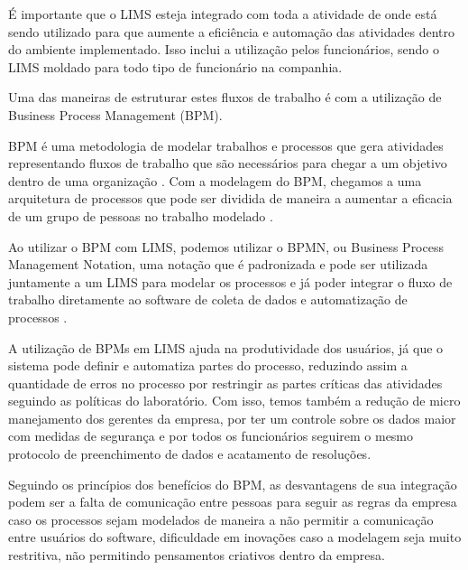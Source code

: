 
É importante que o LIMS esteja integrado com toda a atividade de onde está sendo utilizado para que aumente a eficiência e automação das atividades dentro do ambiente implementado. Isso inclui a utilização pelos funcionários, sendo o LIMS moldado para todo tipo de funcionário na companhia.

Uma das maneiras de estruturar estes fluxos de trabalho é com a utilização de Business Process Management (BPM).

BPM é uma metodologia de modelar trabalhos e processos que gera atividades representando fluxos de trabalho que são necessários para chegar a um objetivo dentro de uma organização \R. Com a modelagem do BPM, chegamos a uma arquitetura de processos que pode ser dividida de maneira a aumentar a eficacia de um grupo de pessoas no trabalho modelado \R.


Ao utilizar o BPM com LIMS, podemos utilizar o BPMN, ou Business Process Management Notation, uma notação que é padronizada \R e pode ser utilizada juntamente a um LIMS para modelar os processos e já poder integrar o fluxo de trabalho diretamente ao software de coleta de dados e automatização de processos \R.


A utilização de BPMs em LIMS ajuda na produtividade dos usuários, já que o sistema pode definir e automatiza partes do processo, reduzindo assim a quantidade de erros no processo por restringir as partes críticas das atividades seguindo as políticas do laboratório.
Com isso, temos também a redução de micro manejamento dos gerentes da empresa, por ter um controle sobre os dados maior com medidas de segurança e por todos os funcionários seguirem o mesmo protocolo de preenchimento de dados e acatamento de resoluções. \R 


Seguindo os princípios dos benefícios do BPM, as desvantagens de sua integração podem ser a falta de comunicação entre pessoas para seguir as regras da empresa caso os processos sejam modelados de maneira a não permitir a comunicação entre usuários do software, dificuldade em inovações caso a modelagem seja muito restritiva, não permitindo pensamentos criativos dentro da empresa.

